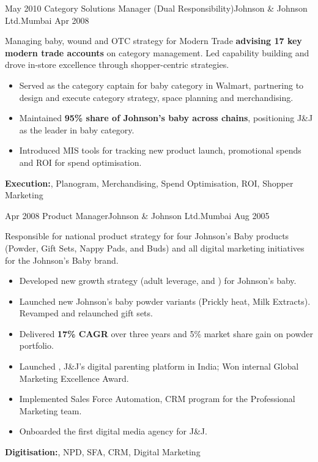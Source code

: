 \begin{experiences}
 \experience
    {May 2010}  {Category Solutions Manager (Dual Responsibility)}{Johnson \& Johnson Ltd.}{Mumbai}
  {Apr 2008}   {
Managing baby, wound and OTC strategy for Modern Trade\textbf{ advising 17 key modern trade accounts} on category management. Led capability building and drove in-store excellence through shopper-centric strategies. 
                      \begin{itemize}
        \item {Served as the category captain for baby category in Walmart, partnering to design and execute category strategy, space planning and merchandising.}
        \item {Maintained \textbf{95\% share of Johnson's baby across chains}, positioning J\&J as the leader in baby category.}
        \item {Introduced MIS tools for tracking new product launch, promotional spends and ROI for spend optimisation.}
                      \end{itemize}
                  }
        { \textbf{Execution:}, Planogram, Merchandising, Spend Optimisation, ROI, Shopper Marketing}
  \emptySeparator

  \experience
  {Apr 2008}  {Product Manager}{Johnson \& Johnson Ltd.}{Mumbai}
  {Aug 2005}   {
Responsible for national product strategy for four Johnson’s Baby products (Powder, Gift Sets, Nappy Pads, and Buds) and all digital marketing initiatives for the Johnson's Baby brand. 
                      \begin{itemize}
        \item {Developed new growth strategy (adult leverage, {} and {}) for Johnson's baby.}
         \item {Launched new Johnson's baby powder variants (Prickly heat, Milk Extracts). Revamped and relaunched gift sets.}
        \item {Delivered \textbf{17\% CAGR} over three years and 5\% market share gain on powder portfolio.}
        \item{Launched {}, J\&J’s digital parenting platform in India; Won internal Global Marketing Excellence Award.}
        \item {Implemented Sales Force Automation, CRM program for the Professional Marketing team.}
        \item {Onboarded the first digital media agency for J\&J.}
                      \end{itemize}
                  }
        {\textbf{Digitisation:}, NPD, SFA, CRM, Digital Marketing}
  \emptySeparator


\end{experiences}
